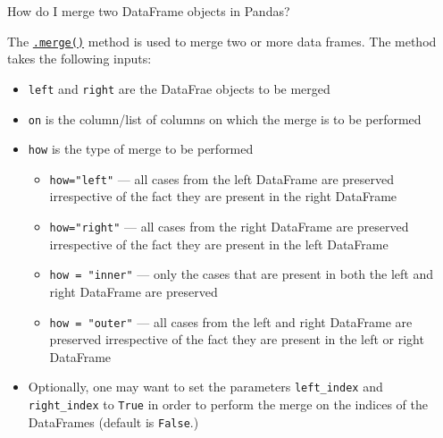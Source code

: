 \documentclass[a4paper,11pt]{book}
\newcommand{\question}[1]{%
    \begin{tcolorbox}[colback=comp_c!10,colframe=comp_c,sidebyside align=top,width=\linewidth,before skip=1ex]
        #1
    \end{tcolorbox}
    \switchcolumn%
}
\newcommand{\note}[1]{%
    \begin{tcolorbox}[colback=white!0,colframe=white!10,width=\linewidth,before skip=1ex]
        #1
    \end{tcolorbox}
}
\begin{document}
\begin{paracol}{2}
	\question{\raggedright How do I merge two DataFrame objects in Pandas?}
	\note{The \href{https://pandas.pydata.org/docs/reference/api/pandas.merge.html?highlight=merge#pandas.merge}{\texttt{.merge()}} method is used to merge two or more data frames. The method takes the following inputs:
	
	\begin{itemize}
		\item \texttt{left} and \texttt{right} are the DataFrae objects to be merged
		\item \texttt{on} is the column/list of columns on which the merge is to be performed
		\item \texttt{how} is the type of merge to be performed
		\begin{itemize}
			\item \texttt{how="left"} --- all cases from the left DataFrame are preserved irrespective of the fact they are present in the right DataFrame
			\item \texttt{how="right"} --- all cases from the right DataFrame are preserved irrespective of the fact they are present in the left DataFrame
			\item \texttt{how = "inner"} --- only the cases that are present in both the left and right DataFrame are preserved
			\item \texttt{how = "outer"} --- all cases from the left and right DataFrame are preserved irrespective of the fact they are present in the left or right DataFrame
		\end{itemize}
		\item Optionally, one may want to set the parameters \texttt{left\_index} and \texttt{right\_index} to \texttt{True} in order to perform the merge on the indices of the DataFrames (default is \texttt{False}.)
	\end{itemize}
	}
\end{paracol}
\clearpage
\end{document}
